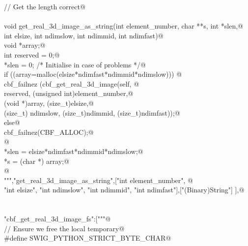 \documentclass[10pt,a4paper,twoside,notitlepage]{article}
\begin{document}
\begin{flushleft}
\begin{minipage}{\linewidth}
\begin{list}{}{}
\mbox{}\verb@// Get the length correct@\\
\mbox{}\verb@@\\
\mbox{}\verb@    void get_real_3d_image_as_string(int element_number, char **s, int *slen,@\\
\mbox{}\verb@    int elsize, int ndimslow, int ndimmid, int ndimfast){@\\
\mbox{}\verb@        void *array;@\\
\mbox{}\verb@        int reserved = 0;@\\
\mbox{}\verb@        *slen = 0; /* Initialise in case of problems */@\\
\mbox{}\verb@        if ((array=malloc(elsize*ndimfast*ndimmid*ndimslow))) {@\\
\mbox{}\verb@               cbf_failnez (cbf_get_real_3d_image(self, @\\
\mbox{}\verb@               reserved, (unsigned int)element_number,@\\
\mbox{}\verb@               (void *)array, (size_t)elsize,@\\
\mbox{}\verb@               (size_t) ndimslow, (size_t)ndimmid, (size_t)ndimfast));@\\
\mbox{}\verb@         }else{@\\
\mbox{}\verb@               cbf_failnez(CBF_ALLOC);@\\
\mbox{}\verb@         }@\\
\mbox{}\verb@        *slen = elsize*ndimfast*ndimmid*ndimslow;@\\
\mbox{}\verb@        *s = (char *) array;@\\
\mbox{}\verb@      }@\\
\mbox{}\verb@""","get_real_3d_image_as_string",["int element_number", @\\
\mbox{}\verb@    "int elsize", "int ndimslow", "int ndimmid", "int ndimfast"],["(Binary)String"] ],@\\
\mbox{}\verb@@\\
\mbox{}\verb@@\\
\mbox{}\verb@"cbf_get_real_3d_image_fs":["""@\\
\mbox{}\verb@// Ensure we free the local temporary@\\
\mbox{}\verb@%{@\\
\mbox{}\verb@#define SWIG_PYTHON_STRICT_BYTE_CHAR@\\
\mbox{}\verb@%}@\\
\mbox{}\verb@%cstring_output_allocate_size(char ** s, int *slen, free(*$1))@\\

\end{list}
\end{minipage}
\end{flushleft}
\end{document}
